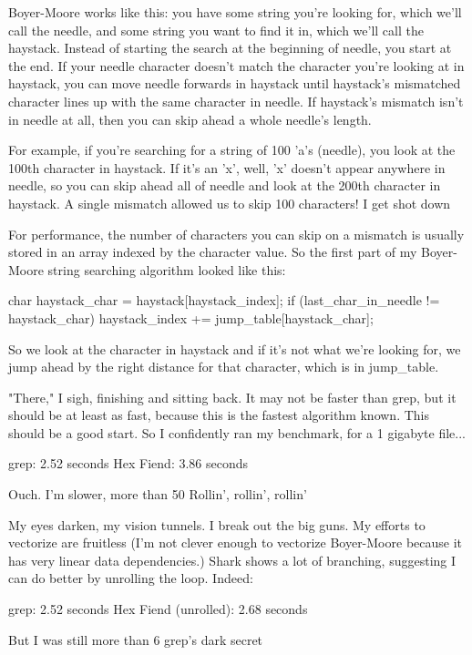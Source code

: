 {{{{{{Boyer-Moore works like this: you have some string you're looking for, which we'll call the needle, and some string you want to find it in, which we'll call the haystack. Instead of starting the search at the beginning of needle, you start at the end. If your needle character doesn't match the character you're looking at in haystack, you can move needle forwards in haystack until haystack's mismatched character lines up with the same character in needle. If haystack's mismatch isn't in needle at all, then you can skip ahead a whole needle's length.

For example, if you're searching for a string of 100 'a's (needle), you look at the 100th character in haystack. If it's an 'x', well, 'x' doesn't appear anywhere in needle, so you can skip ahead all of needle and look at the 200th character in haystack. A single mismatch allowed us to skip 100 characters!
I get shot down

For performance, the number of characters you can skip on a mismatch is usually stored in an array indexed by the character value. So the first part of my Boyer-Moore string searching algorithm looked like this:

char haystack_char = haystack[haystack_index];
if (last_char_in_needle != haystack_char)
   haystack_index += jump_table[haystack_char];

So we look at the character in haystack and if it's not what we're looking for, we jump ahead by the right distance for that character, which is in jump_table.

"There," I sigh, finishing and sitting back. It may not be faster than grep, but it should be at least as fast, because this is the fastest algorithm known. This should be a good start. So I confidently ran my benchmark, for a 1 gigabyte file...

grep:	2.52 seconds
Hex Fiend:	3.86 seconds

Ouch. I'm slower, more than 50%
Rollin', rollin', rollin'

My eyes darken, my vision tunnels. I break out the big guns. My efforts to vectorize are fruitless (I'm not clever enough to vectorize Boyer-Moore because it has very linear data dependencies.) Shark shows a lot of branching, suggesting I can do better by unrolling the loop. Indeed:

grep:	2.52 seconds
Hex Fiend (unrolled):	2.68 seconds

But I was still more than 6%
grep's dark secret

}}}}}}

